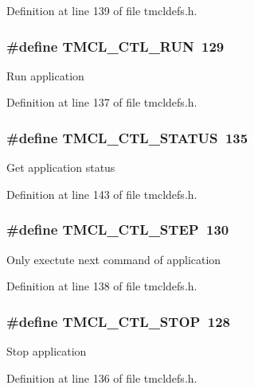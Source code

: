 Definition at line 139 of file tmcldefs.h.\hypertarget{group__CTLFuncs_ga22166cf0f91912ea37048297d8030247}{
\subsubsection[{TMCL\_\-CTL\_\-RUN}]{\setlength{\rightskip}{0pt plus 5cm}\#define TMCL\_\-CTL\_\-RUN~129}}
\label{group__CTLFuncs_ga22166cf0f91912ea37048297d8030247}
Run application 

Definition at line 137 of file tmcldefs.h.\hypertarget{group__CTLFuncs_gaf8364761b483fed9c95abaedffcf0ec2}{
\subsubsection[{TMCL\_\-CTL\_\-STATUS}]{\setlength{\rightskip}{0pt plus 5cm}\#define TMCL\_\-CTL\_\-STATUS~135}}
\label{group__CTLFuncs_gaf8364761b483fed9c95abaedffcf0ec2}
Get application status 

Definition at line 143 of file tmcldefs.h.\hypertarget{group__CTLFuncs_ga0ffb8262b5b83a477e839844789fe986}{
\subsubsection[{TMCL\_\-CTL\_\-STEP}]{\setlength{\rightskip}{0pt plus 5cm}\#define TMCL\_\-CTL\_\-STEP~130}}
\label{group__CTLFuncs_ga0ffb8262b5b83a477e839844789fe986}
Only exectute next command of application 

Definition at line 138 of file tmcldefs.h.\hypertarget{group__CTLFuncs_gaa9e1148b7664ea0b5a78f845332b4fd7}{
\subsubsection[{TMCL\_\-CTL\_\-STOP}]{\setlength{\rightskip}{0pt plus 5cm}\#define TMCL\_\-CTL\_\-STOP~128}}
\label{group__CTLFuncs_gaa9e1148b7664ea0b5a78f845332b4fd7}
Stop application 

Definition at line 136 of file tmcldefs.h.